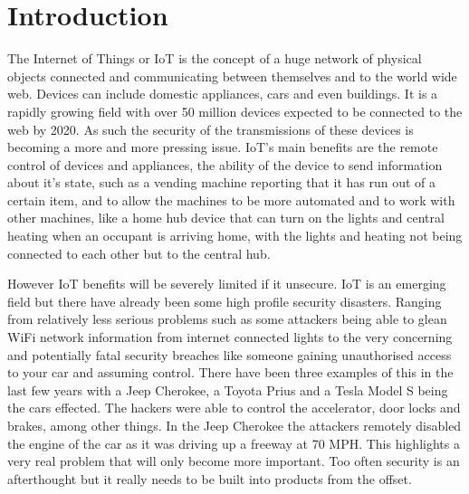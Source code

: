 
\chapter{Introduction}
\label{intro}


\newcommand{\keyword}[1]{\textbf{#1}}
\newcommand{\tabhead}[1]{\textbf{#1}}
\newcommand{\code}[1]{\texttt{#1}}
\newcommand{\file}[1]{\texttt{\bfseries#1}}
\newcommand{\option}[1]{\texttt{\itshape#1}}


The Internet of Things or IoT is the concept of a huge network of physical objects connected and communicating between themselves and to the world wide web. Devices can include domestic appliances, cars and even buildings. It is a rapidly growing field with over 50 million devices expected to be connected to the web by 2020\cite{50milby2020}. As such the security of the transmissions of these devices is becoming a more and more pressing issue. IoT's main benefits are the remote control of devices and appliances, the ability of the device to send information about it's state, such as a vending machine reporting that it has run out of a certain item, and to allow the machines to be more automated and to work with other machines, like a home hub device that can turn on the lights and central heating when an occupant is arriving home, with the lights and heating not being connected to each other but to the central hub.
	
	However IoT benefits will be severely limited if it unsecure. IoT is an emerging field but there have already been some high profile security disasters. Ranging from relatively less serious problems such as some attackers being able to glean WiFi network information from internet connected lights\cite{hackingsum} to the very concerning and potentially fatal security breaches like someone gaining unauthorised access to your car and assuming control. There have been three examples of this in the last few years with a Jeep Cherokee\cite{jeephack}, a Toyota Prius\cite{priushack} and a Tesla Model S\cite{teslahack} being the cars effected. The hackers were able to control the accelerator, door locks and brakes, among other things. In the Jeep Cherokee the attackers remotely disabled the engine of the car as it was driving up a freeway at 70 MPH. This highlights a very real problem that will only become more important. Too often security is an afterthought but it really needs to be built into products from the offset.

